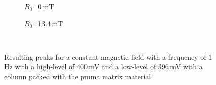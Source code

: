 \begin{figure}
            \begin{subfigure}{0.49\textwidth}
                  \flushleft
                  \caption{$B_{0}$=0\,mT}\label{fig:0mT_pmma}
          \end{subfigure}\hfill
        \begin{subfigure}{0.49\textwidth}
                \flushright
                \caption{$B_{0}$=13.4\,mT}\label{fig:13mT_pmma}
        \end{subfigure}
        \\
        
        \caption[Resulting peaks for a constant magnetic field for \gls{pmma}]{Resulting peaks for a constant magnetic field with a frequency of 1\,Hz with a high-level of 400\,mV and a low-level of 396\,mV with a column packed with the \gls{pmma} matrix material}
        \label{fig:PMMA_peaks_comp}
  \end{figure}


